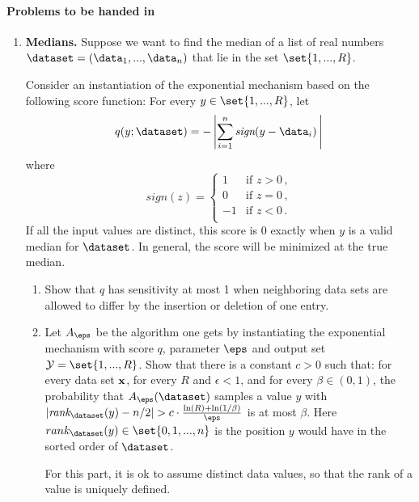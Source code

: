 \documentclass[11pt]{article}
\begin{document}
 \paragraph{Problems to be handed in}
\begin{enumerate}[leftmargin=\parindent, itemsep=3ex]

\item     {\bf Medians.}
    Suppose we want to find the median of a list of real numbers
      $\dataset = (\data_1,...,\data_n)$ that lie in the set $\set{1,...,R}$. 

      Consider an instantiation of the exponential mechanism based on the
      following score function: 
      For every $y\in \set{1,...,R}$, let
        $$q(y; \dataset) = - \left|\sum_{i=1}^n \textit{sign}(y - \data_i)\, \right|
        \,$$
        where $$\textit{sign}(z)=
        \begin{cases}
          1 & \text{if }z>0 \,,\\
          0 &          \text{if }z=0 \,,\\
          -1 & \text{if }z<0 \,.\\
        \end{cases}$$ If all the input values are distinct, this score
        is 0 exactly when $y$ is a valid median for $\dataset$. In
        general, the score will be minimized at the true median.


        \begin{enumerate}
        \item Show that $q$ has sensitivity at most 1 when
          neighboring data sets are allowed to differ by the insertion
          or deletion of one entry.

          \item Let $A_\eps$ be the algorithm one gets by instantiating the
            exponential mechanism with score $q$, parameter $\eps$ and
            output set $\mathcal{Y} = \set{1,...,R}$. Show that there is a constant $c>0$ such that:
            for every data set $\bf x$, for
            every $R$ and $\epsilon<1$, and for every
            $\beta\in (0,1)$, the probability that $A_\eps(\dataset)$ samples a value
            $y$ with
            $|\textit{rank}_{\dataset}(y) -  n/2 | > c\cdot \frac {\ln(R) +
              \ln(1/\beta)}{\eps}$ is at most $\beta$.
            Here $rank_{\dataset}(y) \in\set{0,1,...,n}$ is the position $y$ would have in the
            sorted order of $\dataset$.

            For this part, it is ok to
            assume distinct data values, so that the rank of a value
            is uniquely defined.


\end{enumerate}
\end{enumerate}
\end{document}
